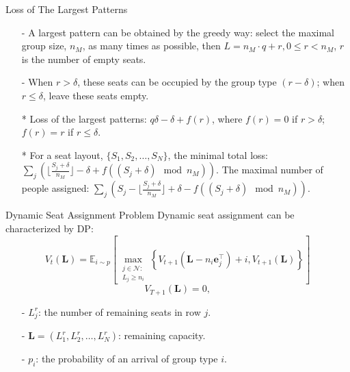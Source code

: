   \begin{frame}{Loss of The Largest Patterns}
    \begin{itemize}
      \item[-] A largest pattern can be obtained by the greedy way: select the maximal group size, $n_{M}$, as many times as possible, then $L = n_{M} \cdot q + r, 0 \leq r < n_{M}$, $r$ is the number of empty seats. 
      \item[-] When $r > \delta$, these seats can be occupied by the group type $(r-\delta)$; when $r \leq \delta$, leave these seats empty.
      \item[*] Loss of the largest patterns: $q \delta -\delta + f(r)$, where $f(r) =0$ if $r > \delta$; $f(r) = r$ if $r \leq \delta$.
      \item[*] For a seat layout, $\{S_1, S_2, \ldots, S_{N}\}$, the minimal total loss: $\sum_{j} (\lfloor \frac{S_j+\delta}{n_{M}} \rfloor -\delta + f((S_j + \delta) \mod n_{M}))$. The maximal number of people assigned: $\sum_{j} (S_j - \lfloor \frac{S_j+\delta}{n_{M}} \rfloor + \delta - f((S_j +\delta)\mod n_{M}))$.
    \end{itemize}
  \end{frame}
  
  \begin{frame}{Dynamic Seat Assignment Problem}
    \centering
    Dynamic seat assignment can be characterized by DP:
    $$V_{t}(\mathbf{L}) = \mathbb{E}_{i \sim p}\left[\max_{\substack{j \in \mathcal{N}: \\ L_j \geqslant {n}_{i}}}\left\{V_{t+1}\left(\mathbf{L}- n_{i}\mathbf{e}_j^{\intercal} \right)+ i, V_{t+1}(\mathbf{L})\right\}\right]$$
    $$V_{T+1}(\mathbf{L}) = 0,$$

    \begin{itemize}
      \item[-] $L^{r}_{j}$: the number of remaining seats in row $j$.
      \item[-] $\mathbf{L} = (L^{r}_1, L^{r}_2, \ldots, L^{r}_{N})$: remaining capacity. 
      \item[-] $p_i$: the probability of an arrival of group type $i$.
    \end{itemize}
\end{frame}